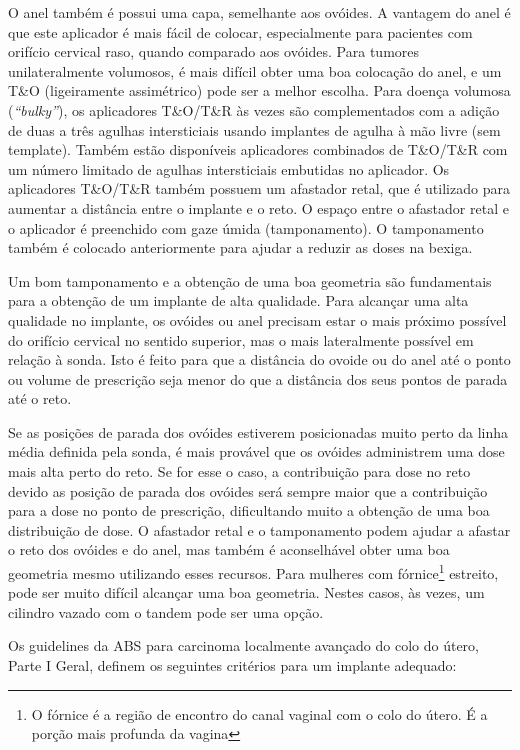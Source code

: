 \documentclass[11pt,a4paper]{article}
\begin{document}
	O anel também é possui uma capa, semelhante aos ovóides. A vantagem do anel é que este aplicador é mais fácil de colocar, especialmente para pacientes com orifício cervical raso, quando comparado aos ovóides. Para tumores unilateralmente volumosos, é mais difícil obter uma boa colocação do anel, e um T\&O (ligeiramente assimétrico) pode ser a melhor escolha. Para doença volumosa (\textit{``bulky''}), os aplicadores T\&O/T\&R às vezes são complementados com a adição de duas a três agulhas intersticiais usando implantes de agulha à mão livre (sem template). Também estão disponíveis aplicadores combinados de T\&O/T\&R com um número limitado de agulhas intersticiais embutidas no aplicador. Os aplicadores T\&O/T\&R também possuem um afastador retal, que é utilizado para aumentar a distância entre o implante e o reto. O espaço entre o afastador retal e o aplicador é preenchido com gaze úmida (tamponamento). O tamponamento também é colocado anteriormente para ajudar a reduzir as doses na bexiga.

	Um bom tamponamento e a obtenção de uma boa geometria são fundamentais para a obtenção de um implante de alta qualidade. Para alcançar uma alta qualidade no implante, os ovóides ou anel precisam estar o mais próximo possível do orifício cervical no sentido superior, mas o mais lateralmente possível em relação à sonda. Isto é feito para que a distância do ovoide ou do anel até o ponto ou volume de prescrição seja menor do que a distância dos seus pontos de parada até o reto.

	Se as posições de parada dos ovóides estiverem posicionadas muito perto da linha média definida pela sonda, é mais provável que os ovóides administrem uma dose mais alta perto do reto. Se for esse o caso, a contribuição para dose no reto devido as posição de parada dos ovóides será sempre maior que a contribuição para a dose no ponto de prescrição, dificultando muito a obtenção de uma boa distribuição de dose. O afastador retal e o tamponamento podem ajudar a afastar o reto dos ovóides e do anel, mas também é aconselhável obter uma boa geometria mesmo utilizando esses recursos. Para mulheres com fórnice\footnote{O fórnice é a região de encontro do canal vaginal com o colo do útero. É a porção mais profunda da vagina} estreito, pode ser muito difícil alcançar uma boa geometria. Nestes casos, às vezes, um cilindro vazado com o tandem pode ser uma opção.

	Os guidelines da ABS para carcinoma localmente avançado do colo do útero, Parte I Geral, definem os seguintes critérios para um implante adequado:
\end{document}
